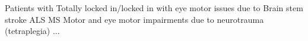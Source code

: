 Patients with
Totally locked in/locked in with eye motor issues due to
Brain stem stroke
ALS
MS
Motor and eye motor impairments due to neurotrauma (tetraplegia)
...

\cite{Guo2022}
\cite{Prasad2010}
\cite{Serra2018}
\cite{Bogousslavsky1987}
\cite{Castelnovo2016}
\cite{Polet2020}
